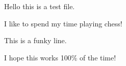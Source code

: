 
Hello this is a test file. 


I like to spend my time playing chess! %

This is a funky line. %

I hope this works 100\% of the time!

